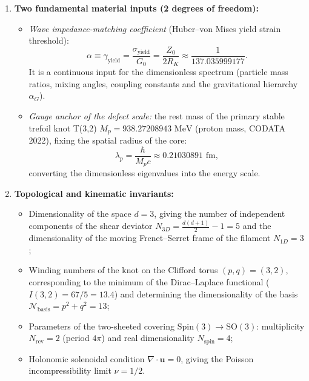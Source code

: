\documentclass[11pt,a4paper]{article}
\theoremstyle{definition}
\theoremstyle{remark}
\begin{document}
\begin{enumerate}
\item \textbf{Two fundamental material inputs (2 degrees of freedom):}
\begin{itemize}
	\item \textit{Wave impedance-matching coefficient} (Huber--von Mises yield strain threshold):
\begin{equation}
	\alpha \equiv \gamma_{\mathrm{yield}} = \frac{\sigma_{\mathrm{yield}}}{G_0} = \frac{Z_0}{2 R_K} \approx \frac{1}{137.035999177}.
	\label{eq:alpha_impedance_def}
\end{equation}
	It is a continuous input for the dimensionless spectrum (particle mass ratios, mixing angles, coupling constants and the gravitational hierarchy $\alpha_G$).
	\item \textit{Gauge anchor of the defect scale:} the rest mass of the primary stable trefoil knot T(3,2) $M_p = 938.27208943\text{ MeV}$ (proton mass, CODATA 2022), fixing the spatial radius of the core:
\begin{equation}
	\lambda_p = \frac{\hbar}{M_p c} \approx 0.21030891\text{ fm},
	\label{eq:lambda_p_anchor_def}
\end{equation}
	converting the dimensionless eigenvalues into the energy scale.
\end{itemize}
		
\item \textbf{Topological and kinematic invariants:}
\begin{itemize}
	\item Dimensionality of the space $d = 3$, giving the number of independent components of the shear deviator $N_{3D} = \frac{d(d+1)}{2} - 1 = 5$ and the dimensionality of the moving Frenet--Serret frame of the filament $N_{1D} = 3$;
	\item Winding numbers of the knot on the Clifford torus $(p, q) = (3, 2)$, corresponding to the minimum of the Dirac--Laplace functional ($I(3,2) = 67/5 = 13.4$) and determining the dimensionality of the basis $\mathcal{N}_{\mathrm{basis}} = p^2 + q^2 = 13$;
	\item Parameters of the two-sheeted covering $\mathrm{Spin}(3) \to \mathrm{SO}(3)$: multiplicity $N_{\mathrm{rev}} = 2$ (period $4\pi$) and real dimensionality $N_{\mathrm{spin}} = 4$;
	\item Holonomic solenoidal condition $\nabla \cdot \mathbf{u} = 0$, giving the Poisson incompressibility limit $\nu = 1/2$.
\end{itemize}
		

\end{enumerate}
\end{document}
